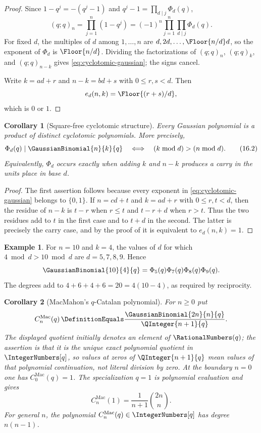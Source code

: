 \documentclass[11pt,a4paper,oneside,openany]{book}
\newtheorem{corollary}[corollary]{Corollary}
\theoremstyle{definition}
\newtheorem{example}[example]{Example}
\theoremstyle{remark}
\newcommand{\MacMahonQCatalanPolynomial}[2]{%
  C^{\mathrm{Mac}}_{#1}\!\left(#2\right)}
\begin{document}
\begin{proof}
Since $1-q^j=-(q^j-1)$ and $q^j-1=\prod_{d\mid j}\Phi_d(q)$,
\[
 (q;q)_n
 =\prod_{j=1}^{n}(1-q^j)
 =(-1)^n\prod_{j=1}^{n}\prod_{d\mid j}\Phi_d(q).
\]
For fixed $d$, the multiples of $d$ among $1,\ldots,n$ are $d,2d,\ldots,\Floor{n/d}d$, so the exponent of $\Phi_d$ is $\Floor{n/d}$.  Dividing the factorizations of $(q;q)_n$, $(q;q)_k$, and $(q;q)_{n-k}$ gives \eqref{eq:cyclotomic-gaussian}; the signs cancel.

Write $k=ad+r$ and $n-k=bd+s$ with $0\le r,s<d$.  Then
\[
 e_d(n,k)=\Floor{(r+s)/d},
\]
which is $0$ or $1$.
\end{proof}

\begin{corollary}[Square-free cyclotomic structure]\label{cor:squarefree-cyclotomic}
Every Gaussian polynomial is a product of distinct cyclotomic polynomials.  More precisely,
\[
 \Phi_d(q)\mid\GaussianBinomial{n}{k}{q}
 \quad\Longleftrightarrow\quad
 (k\bmod d)> (n\bmod d).
 \tag{16.2}\label{eq:carry-criterion}
\]
Equivalently, $\Phi_d$ occurs exactly when adding $k$ and $n-k$ produces a carry in the units place in base $d$.
\end{corollary}

\begin{proof}
The first assertion follows because every exponent in \eqref{eq:cyclotomic-gaussian} belongs to $\{0,1\}$.  If $n=cd+t$ and $k=ad+r$ with $0\le r,t<d$, then the residue of $n-k$ is $t-r$ when $r\le t$ and $t-r+d$ when $r>t$.  Thus the two residues add to $t$ in the first case and to $t+d$ in the second.  The latter is precisely the carry case, and by the proof of  it is equivalent to $e_d(n,k)=1$.
\end{proof}

\begin{example}
For $n=10$ and $k=4$, the values of $d$ for which $4\bmod d>10\bmod d$ are $d=5,7,8,9$.  Hence
\[
 \GaussianBinomial{10}{4}{q}=\Phi_5(q)\Phi_7(q)\Phi_8(q)\Phi_9(q).
\]
The degrees add to $4+6+4+6=20=4(10-4)$, as required by reciprocity.
\end{example}

\begin{corollary}[MacMahon's $q$-Catalan polynomial]\label{cor:q-catalan}
For $n\ge0$ put
\[
 \MacMahonQCatalanPolynomial{n}{q}
 \DefinitionEquals
 \frac{\GaussianBinomial{2n}{n}{q}}{\QInteger{n+1}{q}}.
\]
The displayed quotient initially denotes an element of $\RationalNumbers(q)$;
the assertion is that it is the unique exact polynomial quotient in
$\IntegerNumbers[q]$, so values at zeros of $\QInteger{n+1}{q}$ mean values of
that polynomial continuation, not literal division by zero.  At the boundary
$n=0$ one has
$\MacMahonQCatalanPolynomial{0}{q}=1$.  The specialization $q=1$ is polynomial
evaluation and gives
\[
 \MacMahonQCatalanPolynomial{n}{1}
 =\frac1{n+1}\binom{2n}{n}.
\]
For general $n$, the polynomial
$\MacMahonQCatalanPolynomial{n}{q}\in\IntegerNumbers[q]$ has degree $n(n-1)$.
\end{corollary}
\end{document}
